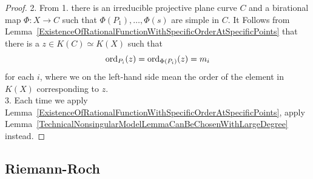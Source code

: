 \begin{proof}
        2. From 1. there is an irreducible projective plane curve $C$ and a birational map $\Phi: X\rightarrow C$ such that $\Phi(P_1),\dots,\Phi(s)$ are simple in $C$. It Follows from Lemma~\ref{ExistenceOfRationalFunctionWithSpecificOrderAtSpecificPoints} that there is a $z\in K(C)\simeq K(X)$ such that 
        $$
            \mathrm{ord}_{P_i}(z)=\mathrm{ord}_{\Phi(P_i)}(z) = m_i 
        $$
        for each $i$, where we on the left-hand side mean the order of the element in $K(X)$ corresponding to $z$.\\
        3. Each time we apply Lemma~\ref{ExistenceOfRationalFunctionWithSpecificOrderAtSpecificPoints}, apply Lemma~\ref{TechnicalNonsingularModelLemmaCanBeChosenWithLargeDegree} instead. 
    \end{proof}
    \subsection{Riemann-Roch}
